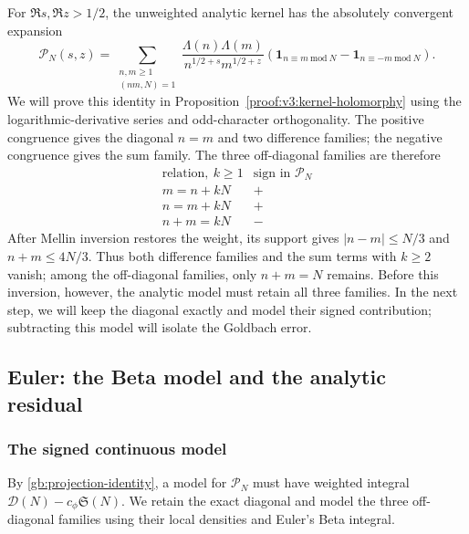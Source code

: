 \documentclass[12pt,a4paper]{amsart}
\numberwithin{equation}{section}
\def\le{\leqslant}
\def\ge{\geqslant}
\theoremstyle{plain}
\theoremstyle{definition}
\theoremstyle{remark}
\begin{document}
For $\Re s,\Re z>1/2$, the unweighted analytic kernel has the
absolutely convergent expansion
\[
 \mathscr P_N(s,z)=
 \sum_{\substack{n,m\ge1\\(nm,N)=1}}
 \frac{\Lambda(n)\Lambda(m)}{n^{1/2+s}m^{1/2+z}}
 \left(\mathbf1_{n\equiv m\ \mathrm{mod}\ N}
              -\mathbf1_{n\equiv-m\ \mathrm{mod}\ N}\right).
\]
We will prove this identity in
Proposition~\ref{proof:v3:kernel-holomorphy} using the
logarithmic-derivative series and odd-character orthogonality.
The positive congruence gives the diagonal $n=m$ and two difference
families; the negative congruence gives the sum family. The three
off-diagonal families are therefore
\[
 \begin{array}{c|c}
 \text{relation},\ k\ge1 & \text{sign in }\mathscr P_N\\ \hline
 m=n+kN & +\\
 n=m+kN & +\\
 n+m=kN & -
 \end{array}
\]
After Mellin inversion restores the weight, its support gives
$|n-m|\le N/3$ and $n+m\le4N/3$. Thus both difference families
and the sum terms with $k\ge2$ vanish; among the off-diagonal
families, only $n+m=N$ remains. Before this inversion, however,
the analytic model must retain all three families. In the next step,
we will keep the diagonal exactly and model their signed contribution;
subtracting this model will isolate the Goldbach error.

\subsection{Euler: the Beta model and the analytic residual}
\label{story:euler}

\subsubsection{The signed continuous model}

By \eqref{gb:projection-identity}, a model for $\mathscr P_N$ must
have weighted integral $\mathcal D(N)-c_\phi\mathfrak S(N)$.
We retain the exact diagonal and model the three off-diagonal
families using their local densities and Euler's Beta integral.
\end{document}
